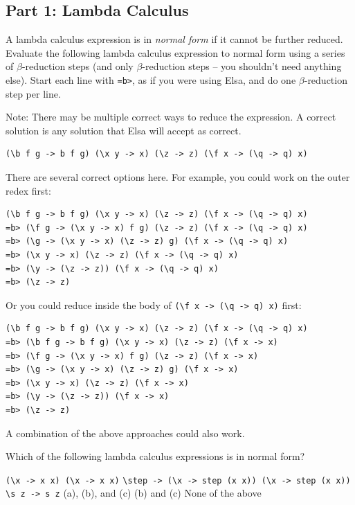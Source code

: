 \documentclass[addpoints]{exam}
\begin{document}
\begin{questions}

\subsection*{\textbf{Part 1: Lambda Calculus}}

\question[4] A lambda calculus expression is in \emph{normal form} if it cannot be further reduced.  Evaluate the following lambda calculus expression to normal form using a series of $\beta$-reduction steps (and only $\beta$-reduction steps -- you shouldn't need anything else).  Start each line with \texttt{=b>}, as if you were using Elsa, and do one $\beta$-reduction step per line.

Note: There may be multiple correct ways to reduce the expression.  A correct solution is any solution that Elsa will accept as correct.

\begin{verbatim}
(\b f g -> b f g) (\x y -> x) (\z -> z) (\f x -> (\q -> q) x)
\end{verbatim}
  \begin{solutionorbox}[3.5in]
There are several correct options here.  For example, you could work on the outer redex first:
\begin{verbatim}
(\b f g -> b f g) (\x y -> x) (\z -> z) (\f x -> (\q -> q) x)
=b> (\f g -> (\x y -> x) f g) (\z -> z) (\f x -> (\q -> q) x)
=b> (\g -> (\x y -> x) (\z -> z) g) (\f x -> (\q -> q) x)
=b> (\x y -> x) (\z -> z) (\f x -> (\q -> q) x)
=b> (\y -> (\z -> z)) (\f x -> (\q -> q) x)
=b> (\z -> z)
\end{verbatim}

Or you could reduce inside the body of \verb|(\f x -> (\q -> q) x)| first:
\begin{verbatim}
(\b f g -> b f g) (\x y -> x) (\z -> z) (\f x -> (\q -> q) x)
=b> (\b f g -> b f g) (\x y -> x) (\z -> z) (\f x -> x)
=b> (\f g -> (\x y -> x) f g) (\z -> z) (\f x -> x)
=b> (\g -> (\x y -> x) (\z -> z) g) (\f x -> x)
=b> (\x y -> x) (\z -> z) (\f x -> x)
=b> (\y -> (\z -> z)) (\f x -> x)
=b> (\z -> z)
\end{verbatim}

A combination of the above approaches could also work.
  \end{solutionorbox}

\question[3] Which of the following lambda calculus expressions is in normal form?

  \begin{choices}
    \choice \verb|(\x -> x x) (\x -> x x)| 
    \choice \verb|\step -> (\x -> step (x x)) (\x -> step (x x))|
    \CorrectChoice \verb|\s z -> s z|
    \choice (a), (b), and (c)
    \choice (b) and (c)
    \choice None of the above
  \end{choices}


\end{questions}
\end{document}
